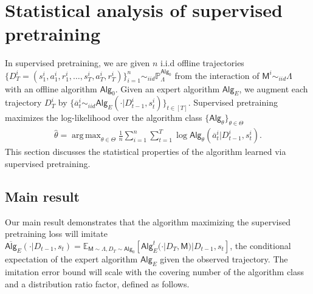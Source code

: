\documentclass[10pt]{article}
\DeclareMathOperator*{\argmax}{arg\,max}
\newcommand{\<}{\left\langle}
\renewcommand{\>}{\right\rangle}
\newcommand{\E}{\mathbb{E}}
\renewcommand{\P}{\mathbb{P}}
\newcommand{\inst}{{\mathsf{M}}}
\newcommand{\widebar}[1]{\overline{#1}}
\newcommand{\state}{{s}}
\newcommand{\action}{{a}}
\newcommand{\eaction}{{\widebar{a}}}
\newcommand{\reward}{{r}}
\newcommand{\totlen}{{T}}
\newcommand{\ith}{{i}}
\newcommand{\sAlg}{{\mathsf{Alg}}}
\newcommand{\osAlg}{\overline{\mathsf{Alg}}}
\newcommand{\dset}{{D}}
\newcommand{\Numobs}{{n}}
\newcommand{\Par}{{\theta}}
\newcommand{\Parspace}{{\Theta}}
\newcommand{\EstPar}{{\widehat{\theta}}}
\newcommand{\prior}{{\Lambda}}
\newcommand{\shortexp}{{E}}
\begin{document}
\section{Statistical analysis of supervised pretraining}\label{sec:supervised-pretraining}


In supervised pretraining, we are given $\Numobs$ i.i.d offline trajectories $\{\dset^\ith_\totlen =  (\state^\ith_1,\action^\ith_1, \reward^\ith_1, \ldots, \state^\ith_\totlen, \allowbreak \action^\ith_\totlen, \allowbreak\reward^\ith_\totlen) \}_{i=1}^\Numobs \sim_{iid} \P_\prior^{\sAlg_0}$ from the interaction of $\inst^\ith \sim_{iid} \prior$ with an offline algorithm $\sAlg_0$. Given an expert algorithm $\sAlg_{\shortexp}$, we augment each trajectory $\dset_{\totlen}^i$ by $\{ \eaction_t^i \sim_{iid} \sAlg_{\shortexp}( \cdot |\dset_{t-1}^i, \state_t^i)\}_{t \in [\totlen]}$. Supervised pretraining maximizes the log-likelihood over the algorithm class $\{ \sAlg_\Par\}_{\Par\in\Parspace}$
\begin{align}
\EstPar=\argmax_{\Par\in\Parspace}  \frac{1}{\Numobs}\sum_{i=1}^\Numobs\sum_{t=1}^\totlen\log \sAlg_\Par(\eaction^\ith_{t}|\dset_{t-1}^\ith,\state^\ith_t). \label{eq:general_mle}
\end{align}
This section discusses the statistical properties of the algorithm learned via supervised pretraining. 






\subsection{Main result}











Our main result demonstrates that the algorithm maximizing the supervised pretraining loss will imitate $\osAlg_{\shortexp}(\cdot|\dset_{t-1},\state_t) = \E_{\inst\sim \prior,  \dset_{\totlen} \sim \sAlg_0}[\sAlg_{\shortexp}^t(\cdot|\dset_\totlen,\inst)|\dset_{t-1},\state_t]$, the conditional expectation of the expert algorithm $\sAlg_{\shortexp}$ given the observed trajectory. The imitation error bound will scale with the covering number of the algorithm class and a  distribution ratio factor, defined as follows.
\end{document}
